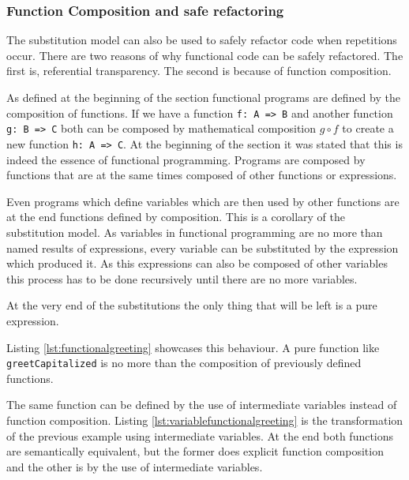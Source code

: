 \documentclass[../main.tex]{subfiles}
\begin{document}
\subsubsection{Function Composition and safe refactoring}

The substitution model can also be used to safely refactor code when repetitions
occur. There are two reasons of why functional code can be safely refactored.
The first is, referential transparency. The second is because of function
composition.

As defined at the beginning of the section functional programs are defined by
the composition of functions. If we have a function \texttt{f: A => B} and
another function \texttt{g: B => C} both can be composed by mathematical
composition $g \circ f$ to create a new function \texttt{h: A => C}. At the
beginning of the section it was stated that this is indeed the essence of
functional programming. Programs are composed by functions that are at the same
times composed of other functions or expressions.

Even programs which define variables which are then used by other functions are
at the end functions defined by composition. This is a corollary of the
substitution model. As variables in functional programming are no more than
named results of expressions, every variable can be substituted by the expression
which produced it. As this expressions can also be composed of other variables
this process has to be done recursively until there are no more variables.

At the very end of the substitutions the only thing that will be left is a pure
expression.

Listing \ref{lst:functionalgreeting} showcases this behaviour. A pure function
like \texttt{greetCapitalized} is no more than the composition of previously defined
functions.



The same function can be defined by the use of intermediate variables instead of
function composition. Listing \ref{lst:variablefunctionalgreeting} is the
transformation of the previous example using intermediate variables. At the end
both functions are semantically equivalent, but the former does explicit
function composition and the other is by the use of intermediate variables.


\end{document}
